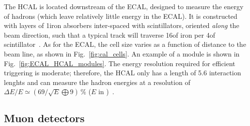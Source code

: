 The HCAL is located downstream of the ECAL, designed to measure the energy of hadrons (which leave relatively little energy in the ECAL). It is constructed with layers of 1\cm iron absorbers inter-spaced with scintillators, oriented \emph{along} the beam direction, such that a typical track will traverse 16\mm of iron per 4\mm of scintillator~\cite{CAL-TDR}. As for the ECAL, the cell size varies as a function of distance to the beam line, as shown in Fig.~\ref{fig:cal_cells}. An example of a module is shown in Fig.~\ref{fig:ECAL_HCAL_modules}.  The energy resolution required for efficient triggering is moderate; therefore,  the HCAL only has a length of 5.6 interaction lenghts and can measure the hadron energies at a resolution of $\Delta E/E \simeq (69/\sqrt{E} \bigoplus 9)\,\%$ ($E$ in \gevcc)~\cite{LHCb-detector}.


\subsection{Muon detectors} %
\label{sub:muon_detectors}

